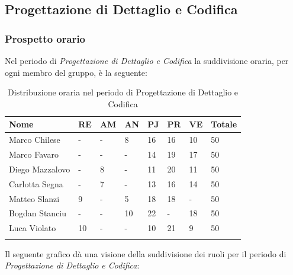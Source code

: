 \newpage
\subsection{Progettazione di Dettaglio e Codifica}
\subsubsection{Prospetto orario}

Nel periodo di \textit{Progettazione di Dettaglio e Codifica} la suddivisione oraria, per ogni membro del gruppo, è la seguente:

\begin{longtable}{|C{.30\textwidth}|C{.06\textwidth}|C{.06\textwidth}|C{.06\textwidth} | C{.06\textwidth}| C{.06\textwidth} | C{.06\textwidth} | C{.10\textwidth} |}
	\hline
	\textbf{Nome} & \textbf{RE} & \textbf{AM} & \textbf{AN} & \textbf{PJ} & \textbf{PR} & \textbf{VE} & \textbf{Totale}\\
	\hline 
	Marco Chilese & - & - & 8 & 16 & 16 & 10 & 50 \\
	\hline
	Marco Favaro &  - & - & - & 14 & 19 & 17 & 50 \\
	\hline
	Diego Mazzalovo & - & 8 & - & 11 & 20 & 11 & 50 \\
	\hline
	Carlotta Segna & - & 7 & - & 13 & 16 & 14 & 50 \\
	\hline
	Matteo Slanzi & 9 & - & 5 & 18 & 18 & - & 50 \\
	\hline
	Bogdan Stanciu & - & - & 10 & 22 & - & 18 & 50 \\
	\hline
	Luca Violato & 10 & - & - & 10 & 21 & 9 & 50 \\   
	\hline


\caption{Distribuzione oraria nel periodo di Progettazione di Dettaglio e Codifica}
\label{Distribuzione oraria pdc}
\end{longtable}

Il seguente grafico dà una visione della suddivisione dei ruoli per il periodo di \textit{Progettazione di Dettaglio e Codifica}:


